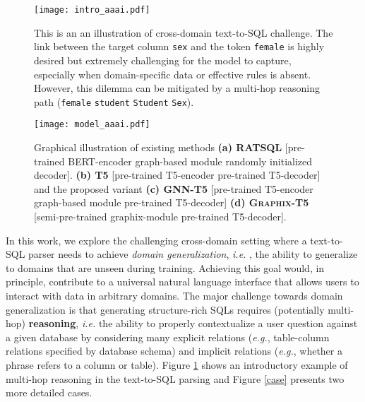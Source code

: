 \documentclass[letterpaper]{article} \usepackage{aaai23}  \usepackage{times}  \usepackage{helvet}  \usepackage{courier}  \usepackage[hyphens]{url}  \usepackage{graphicx} \usepackage{amsmath}
\newcommand{\graphix}{\textsc{Graphix}\xspace}
\def\eg{\emph{e.g.}}
\def\ie{\emph{i.e. }}
\begin{document}
\begin{figure}
    \centering
    \texttt{[image: intro\_aaai.pdf]}
    \caption{This is an an illustration of cross-domain text-to-SQL challenge. The link between the target column \texttt{sex} and the token \texttt{female} is highly desired but extremely challenging for the model to capture, especially when domain-specific data or effective rules is absent. However, this dilemma can be mitigated by a multi-hop reasoning path (\texttt{female}  \texttt{student}  \texttt{Student}  \texttt{Sex}).}
    \label{intro1}
    \vspace{-0.5cm}
\end{figure}

\begin{figure*}
    \centering
    \texttt{[image: model\_aaai.pdf]}
    \caption{Graphical illustration of existing methods \textbf{(a) RATSQL} {[pre-trained BERT-encoder  graph-based module  randomly initialized decoder]}. \textbf{(b) T5} {[pre-trained T5-encoder  pre-trained T5-decoder]} and the proposed variant \textbf{(c) GNN-T5} {[pre-trained T5-encoder   graph-based module  pre-trained T5-decoder]} \textbf{(d) \graphix-T5} {[semi-pre-trained graphix-module  pre-trained T5-decoder]}.}
    \label{t5}
    \vspace{-0.3cm}
\end{figure*}



In this work, we explore the challenging cross-domain setting where a text-to-SQL parser needs to achieve \textit{domain generalization}, \ie, the ability to generalize to domains that are unseen during training. 
Achieving this goal would, in principle, contribute to a universal natural language interface that allows users to interact with data in arbitrary domains. The major challenge towards domain generalization \citep{wang-etal-2020-rat, lgesql,proton,sadga, s2sql} is that generating structure-rich SQLs requires (potentially multi-hop) \textbf{reasoning}, \ie the ability to properly contextualize a user question against a given database by considering many explicit relations (\eg, table-column relations specified by database schema) and implicit relations (\eg, whether a phrase refers to a column or table). 
Figure \ref{intro1} shows an introductory example of multi-hop reasoning in the text-to-SQL parsing and Figure \ref{case} presents two more detailed cases.
\end{document}
